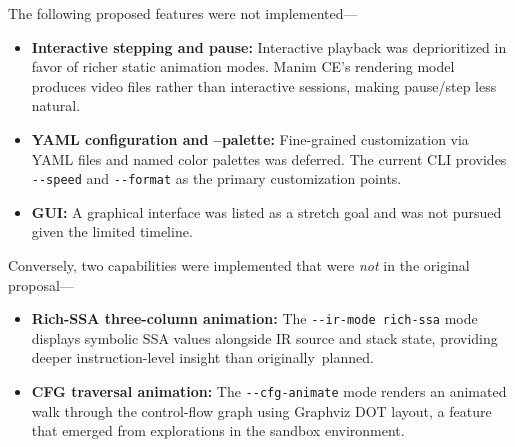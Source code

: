 The following proposed features were not implemented---

\begin{itemize}
    \item \textbf{Interactive stepping and pause:} Interactive playback was deprioritized in favor of richer static animation modes. Manim CE's rendering model produces video files rather than interactive sessions, making pause/step less natural.

    \item \textbf{YAML configuration and --palette:} Fine-grained customization via YAML files and named color palettes was deferred. The current CLI provides \texttt{-{}-speed} and \texttt{-{}-format} as the primary customization points.

    \item \textbf{GUI:} A graphical interface was listed as a stretch goal and was not pursued given the limited timeline.
\end{itemize}

\vspace{1ex}

Conversely, two capabilities were implemented that were \textit{not} in the original proposal---
\begin{itemize}
    \item \textbf{Rich-SSA three-column animation:} The \texttt{-{}-ir-mode rich-ssa} mode displays symbolic SSA values alongside IR source and stack state, providing deeper instruction-level insight than originally~planned.
    \item \textbf{CFG traversal animation:} The \texttt{-{}-cfg-animate} mode renders an animated walk through the control-flow graph using Graphviz DOT layout, a feature that emerged from explorations in the sandbox environment.
\end{itemize}
